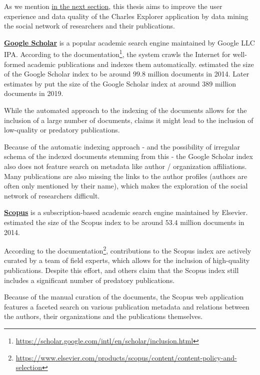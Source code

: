 As we mention \hyperref[sec:goals]{in the next section}, this thesis aims to improve the user experience and data quality of the Charles Explorer application by data mining the social network of researchers and their publications.

\textbf{\href{https://scholar.google.com/}{Google Scholar}} is a popular academic search engine maintained by Google LLC IPA.
According to the documentation\footnote{\url{https://scholar.google.com/intl/en/scholar/inclusion.html}}, the system crawls the Internet for well-formed academic publications and indexes them automatically. 
\cite{google-scholar-size-estimation-2014} estimated the size of the Google Scholar index to be around $99.8$ million documents in 2014.
Later estimates by \cite{google-scholar-size} put the size of the Google Scholar index at around $389$ million documents in 2019.

While the automated approach to the indexing of the documents allows for the inclusion of a large number of documents, 
\cite{predatory-google-scholar-scopus} claims it might lead to the inclusion of low-quality or predatory publications.

Because of the automatic indexing approach - and the possibility of irregular schema of the indexed documents stemming from this -
the Google Scholar index also does not feature search on metadata like author / organization affiliations.
Many publications are also missing the links to the author profiles (authors are often only mentioned by their name), 
which makes the exploration of the social network of researchers difficult.

\textbf{\href{https://www.scopus.com/}{Scopus}} is a subscription-based academic search engine maintained by Elsevier.    
\cite{google-scholar-size-estimation-2014} estimated the size of the Scopus index to be around $53.4$ million documents in 2014.

According to the documentation\footnote{\url{https://www.elsevier.com/products/scopus/content/content-policy-and-selection}}, contributions to the Scopus index 
are actively curated by a team of field experts, which allows for the inclusion of high-quality publications.
Despite this effort, \cite{predatory-scopus} and others claim that the Scopus index still includes a significant number of predatory publications.

Because of the manual curation of the documents, the Scopus web application features a faceted search on various publication metadata
and relations between the authors, their organizations and the publications themselves.

